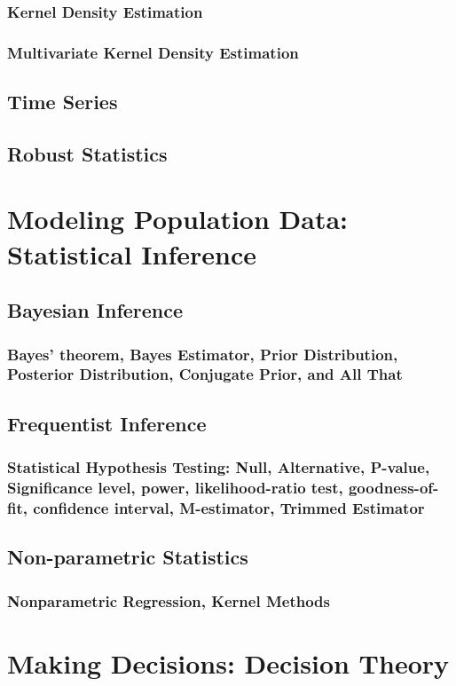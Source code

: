\documentclass{memoir}
\begin{document}
\subsection{Kernel Density Estimation}
\subsection{Multivariate Kernel Density Estimation}
\section{Time Series}
\section{Robust Statistics}


\chapter{Modeling Population Data: Statistical Inference}
\section{Bayesian Inference}
\subsection{Bayes' theorem, Bayes Estimator, Prior Distribution, Posterior Distribution, Conjugate Prior, and All That}

\section{Frequentist Inference}
\subsection{Statistical Hypothesis Testing: Null, Alternative, P-value, Significance level, power, likelihood-ratio test, goodness-of-fit, confidence interval, M-estimator, Trimmed Estimator}

\section{Non-parametric Statistics}
\subsection{Nonparametric Regression, Kernel Methods}

\chapter{Making Decisions: Decision Theory}
\end{document}
